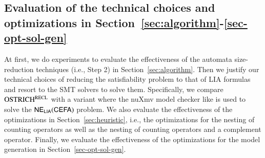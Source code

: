


\subsection{Evaluation of the technical choices and optimizations in Section~\ref{sec:algorithm}-\ref{sec-opt-sol-gen}}\label{subsec:size_reduction_eval}

At first, we do experiments to evaluate the effectiveness of the automata size-reduction techniques (i.e., Step 2) in Section~\ref{sec:algorithm}. Then we justify our technical choices of reducing the satisfiability problem to that of LIA formulas and resort to the SMT solvers to solve them. Specifically, we compare $\rm OSTRICH^{RECL}$ with a variant where the nuXmv model checker like \cite{atva2020} is used to solve the ${\sf NE_{LIA}(CEFA)}$ problem. 
%
We also evaluate the effectiveness of the optimizations in Section~\ref{sec:heuristic}, i.e., the optimizations for the nesting of counting operators as well as the nesting of counting operators and a complement operator. Finally, we evaluate the effectiveness of the optimizations for the model generation in Section~\ref{sec-opt-sol-gen}. 

